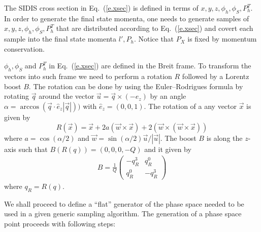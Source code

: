 \documentclass[floatfix,aps,prd,nofootinbib,superscriptaddress,preprint]{revtex4}
\newcommand\3[1]{\boldsymbol{#1}}
\newcommand{\eref}[1]{Eq.~(\ref{e.#1})}
\begin{document}
The SIDIS cross section in \eref{xsec} is defined in terms of
$x,y,z,\phi_h,\phi_S,P_h^T$. In order to generate the final state 
momenta, one needs to generate samples of  $x,y,z,\phi_h,\phi_S,P_h^T$
that are distributed according to \eref{xsec} and covert each sample
into the final state momenta $l',P_h$. Notice that $P_X$ is fixed by
momentum conservation. 

$\phi_h,\phi_S$ and $P_h^T$ in \eref{xsec} are defined in the Breit frame. To
transform the vectors into such frame we need to perform a rotation
$R$ followed by a Lorentz boost $B$. The rotation can be done by using the
Euler–Rodrigues formula by rotating $\vec{q}$  around the vector 
$\vec{u}=\vec{q}\times(-\hat{e}_z)$ 
by an angle $\alpha=\arccos(\vec{q}\cdot \hat{e}_z|\vec{q}|))$ with 
$\hat{e}_z=(0,0,1)$. The rotation of a any vector $\vec{x}$ is given by 
$$
R(\vec{x})=\vec{x}+2a(\vec{w}\times\vec{x})+2(\vec{w}\times(\vec{w}\times\vec{x}))
$$
where $a=\cos(\alpha/2)$ and $\vec{w}=\sin(\alpha/2)\vec{u}/|\vec{u}|$. The
boost $B$ is along the $z$-axis such that $B(R(q))=(0,0,0,-Q)$ and it
given by 
%
\begin{align}
B=\frac{1}{Q}
\begin{pmatrix} 
-q_R^3 & q_R^0 \\
q_R^0 & -q_R^3 
\end{pmatrix}
\end{align}
%
where $q_R=R(q)$.

We shall proceed to define a ``flat'' generator of the
phase space needed to be used in a given generic sampling algorithm.  
The generation of a phase space point proceeds with following 
steps:
\end{document}
